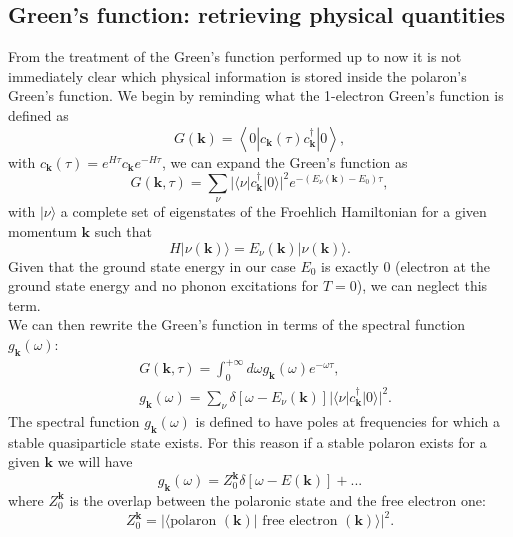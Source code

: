\subsection{Green's function: retrieving physical quantities}
From the treatment of the Green's function performed up to now it is not immediately clear which physical information is stored inside 
the polaron's Green's function. We begin by reminding what the 1-electron Green's function is defined as
\begin{equation}
    G(\mathbf{k})=\left\langle 0| c_\mathbf{k}(\tau)c^\dagger_\mathbf{k}    |0 \right\rangle,
\end{equation}
with $c_\mathbf{k}(\tau)=e^{H\tau}c_\mathbf{k}e^{-H\tau}$, we can expand the Green's function as \cite{mishchenko2000diagrammatic}
\begin{equation}
    G(\mathbf{k},\tau)=\sum_{\nu}|\langle\nu |c^\dagger_{\mathbf{k}}|0\rangle|^2e^{-(E_\nu(\mathbf{k})-E_0)\tau},
\end{equation}
with $|\nu\rangle$ a complete set of eigenstates of the Froehlich Hamiltonian for a given momentum $\mathbf{k}$ such that
\begin{equation}
    H|\nu(\mathbf{k})\rangle=E_\nu(\mathbf{k})|\nu(\mathbf{k})\rangle.
\end{equation}
Given that the ground state energy in our case $E_0$ is exactly 0 (electron at the ground state energy and no phonon excitations for $T=0$), we can neglect this term.\\
We can then rewrite the Green's function in terms of the spectral function $g_\mathbf{k}(\omega)$:
\begin{equation}
\begin{split}
    &G(\mathbf{k},\tau)=\int_0^{+\infty}d\omega g_\mathbf{k}(\omega)e^{-\omega\tau},\\
    &g_\mathbf{k}(\omega)=\sum_\nu \delta[\omega-E_\nu(\mathbf{k})]|\langle\nu |c^\dagger_\mathbf{k}|0\rangle|^2.
\end{split}
\end{equation}
The spectral function $g_\mathbf{k}(\omega)$ is defined to have poles at frequencies for which a stable quasiparticle state exists. For this 
reason if a stable polaron exists for a given $\mathbf{k}$ we will have
\begin{equation}
    g_\mathbf{k}(\omega)=Z_0^\mathbf{k}\delta[\omega-E(\mathbf{k})]+...
\end{equation}
where $Z_0^\mathbf{k}$ is the overlap between the polaronic state and the free electron one:
\begin{equation}
    Z_0^\mathbf{k}=|\langle\text{polaron }(\mathbf{k})|\text{ free electron }(\mathbf{k})\rangle|^2.
\end{equation}
